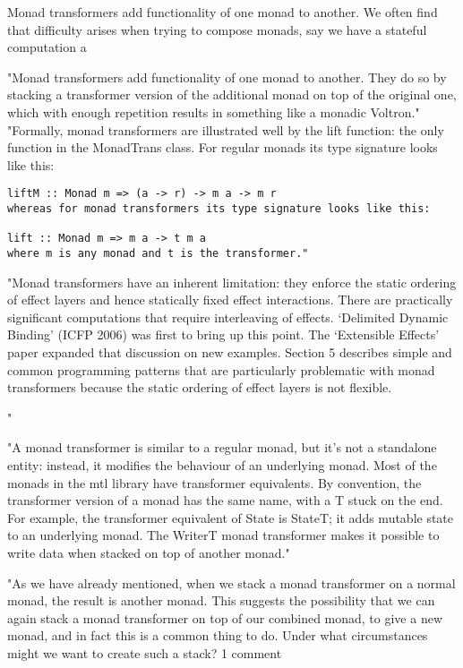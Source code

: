 Monad transformers add functionality of one monad to another.
We often find that difficulty arises when trying to compose monads,
say we have a stateful computation a

"Monad transformers add functionality of one monad to another. They do so by stacking a transformer version of the additional monad on top of the original one, which with enough repetition results in something like a monadic Voltron."
"Formally, monad transformers are illustrated well by the lift function: the only function in the MonadTrans class. For regular monads its type signature looks like this:

\begin{verbatim}
liftM :: Monad m => (a -> r) -> m a -> m r
whereas for monad transformers its type signature looks like this:

lift :: Monad m => m a -> t m a
where m is any monad and t is the transformer."
\end{verbatim}



"Monad transformers have an inherent limitation: they enforce the static ordering of effect layers and hence statically fixed effect interactions. There are practically significant computations that require interleaving of effects. ‘Delimited Dynamic Binding’ (ICFP 2006) was first to bring up this point. The ‘Extensible Effects’ paper expanded that discussion on new examples. Section 5 describes simple and common programming patterns that are particularly problematic with monad transformers because the static ordering of effect layers is not flexible.

"

"A monad transformer is similar to a regular monad, but it's not a standalone entity: instead, it modifies the behaviour of an underlying monad. Most of the monads in the mtl library have transformer equivalents. By convention, the transformer version of a monad has the same name, with a T stuck on the end. For example, the transformer equivalent of State is StateT; it adds mutable state to an underlying monad. The WriterT monad transformer makes it possible to write data when stacked on top of another monad."

"As we have already mentioned, when we stack a monad transformer on a normal monad, the result is another monad. This suggests the possibility that we can again stack a monad transformer on top of our combined monad, to give a new monad, and in fact this is a common thing to do. Under what circumstances might we want to create such a stack? 1 comment


